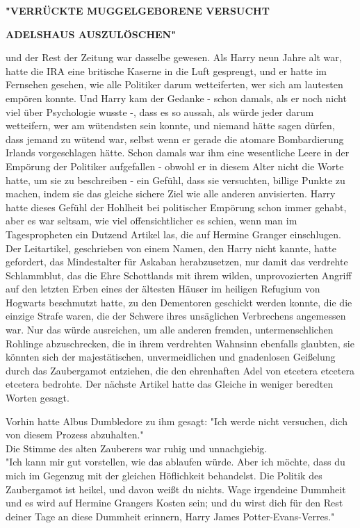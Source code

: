 {\textbf{"VERRÜCKTE MUGGELGEBORENE VERSUCHT}

\textbf{ADELSHAUS AUSZULÖSCHEN"}

und der Rest der Zeitung war dasselbe gewesen. Als Harry neun Jahre alt war, hatte die IRA eine britische Kaserne in die Luft gesprengt, und er hatte im Fernsehen gesehen, wie alle Politiker darum wetteiferten, wer sich am lautesten empören konnte. Und Harry kam der Gedanke - schon damals, als er noch nicht viel über Psychologie wusste -, dass es so aussah, als würde jeder darum wetteifern, wer am wütendsten sein konnte, und niemand hätte sagen dürfen, dass jemand zu wütend war, selbst wenn er gerade die atomare Bombardierung Irlands vorgeschlagen hätte. Schon damals war ihm eine wesentliche Leere in der Empörung der Politiker aufgefallen - obwohl er in diesem Alter nicht die Worte hatte, um sie zu beschreiben - ein Gefühl, dass sie versuchten, billige Punkte zu machen, indem sie das gleiche sichere Ziel wie alle anderen anvisierten. Harry hatte dieses Gefühl der Hohlheit bei politischer Empörung schon immer gehabt, aber es war seltsam, wie viel offensichtlicher es schien, wenn man im Tagespropheten ein Dutzend Artikel las, die auf Hermine Granger einschlugen. Der Leitartikel, geschrieben von einem Namen, den Harry nicht kannte, hatte gefordert, das Mindestalter für Askaban herabzusetzen, nur damit das verdrehte Schlammblut, das die Ehre Schottlands mit ihrem wilden, unprovozierten Angriff auf den letzten Erben eines der ältesten Häuser im heiligen Refugium von Hogwarts beschmutzt hatte, zu den Dementoren geschickt werden konnte, die die einzige Strafe waren, die der Schwere ihres unsäglichen Verbrechens angemessen war. Nur das würde ausreichen, um alle anderen fremden, untermenschlichen Rohlinge abzuschrecken, die in ihrem verdrehten Wahnsinn ebenfalls glaubten, sie könnten sich der majestätischen, unvermeidlichen und gnadenlosen Geißelung durch das Zaubergamot entziehen, die den ehrenhaften Adel von etcetera etcetera etcetera bedrohte. Der nächste Artikel hatte das Gleiche in weniger beredten Worten gesagt.

Vorhin hatte Albus Dumbledore zu ihm gesagt: "Ich werde nicht versuchen, dich von diesem Prozess abzuhalten."\\ Die Stimme des alten Zauberers war ruhig und unnachgiebig.\\ "Ich kann mir gut vorstellen, wie das ablaufen würde. Aber ich möchte, dass du mich im Gegenzug mit der gleichen Höflichkeit behandelst. Die Politik des Zaubergamot ist heikel, und davon weißt du nichts. Wage irgendeine Dummheit und es wird auf Hermine Grangers Kosten sein; und du wirst dich für den Rest deiner Tage an diese Dummheit erinnern, Harry James Potter-Evans-Verres."

}
